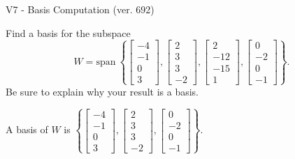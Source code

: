 \begin{exercise}
  \begin{exerciseTitle}V7 - Basis Computation (ver. 692)\end{exerciseTitle}
  \begin{exerciseStatement}
    Find a basis for the subspace 
\[W=\mathrm{span}\ \left\{\left[\begin{array}{r}
-4 \\
-1 \\
0 \\
3
\end{array}\right] , \left[\begin{array}{r}
2 \\
3 \\
3 \\
-2
\end{array}\right] , \left[\begin{array}{r}
2 \\
-12 \\
-15 \\
1
\end{array}\right] , \left[\begin{array}{r}
0 \\
-2 \\
0 \\
-1
\end{array}\right]\right\}.\]
 Be sure to explain why your result is a basis.


  \end{exerciseStatement}
  \begin{exerciseAnswer}
   A basis of \(W\) is  \(\left\{\left[\begin{array}{r}
-4 \\
-1 \\
0 \\
3
\end{array}\right] , \left[\begin{array}{r}
2 \\
3 \\
3 \\
-2
\end{array}\right] , \left[\begin{array}{r}
0 \\
-2 \\
0 \\
-1
\end{array}\right]\right\}\).
  


  \end{exerciseAnswer}
\end{exercise}